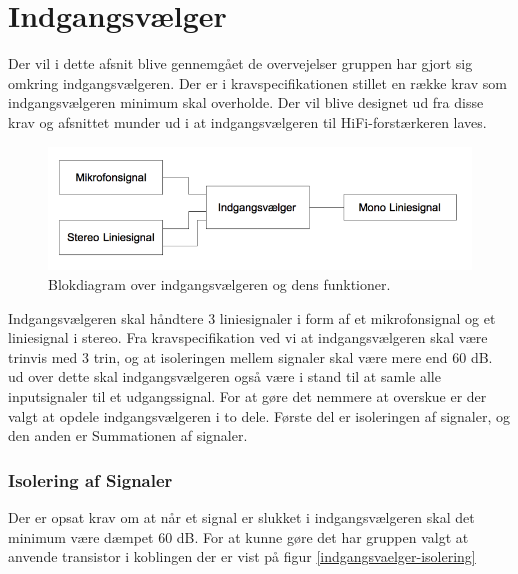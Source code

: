 \chapter{Indgangsvælger}
\label{indgangsvaelger}
Der vil i dette afsnit blive gennemgået de overvejelser gruppen har gjort sig omkring indgangsvælgeren. Der er i kravspecifikationen stillet en række krav som indgangsvælgeren minimum skal overholde. Der vil blive designet ud fra disse krav og afsnittet munder ud i at indgangsvælgeren til HiFi-forstærkeren laves.

\begin{figure}[h]
\centering
\includegraphics[scale=0.4]{implementering/indgangsvaelger/overordnetdesign.png}
\caption{Blokdiagram over indgangsvælgeren og dens funktioner.}
\label{indgangsvaelger-overordnet}
\end{figure}

Indgangsvælgeren skal håndtere 3 liniesignaler i form af et mikrofonsignal og et liniesignal i stereo. Fra kravspecifikation ved vi at indgangsvælgeren skal være trinvis med 3 trin, og at isoleringen mellem signaler skal være mere end 60 dB. ud over dette skal indgangsvælgeren også være i stand til at samle alle inputsignaler til et udgangssignal. For at gøre det nemmere at overskue er der valgt at opdele indgangsvælgeren i to dele. Første del er isoleringen af signaler, og den anden er Summationen af signaler.

\subsection*{Isolering af Signaler}
Der er opsat krav om at når et signal er slukket i indgangsvælgeren skal det minimum være dæmpet 60 dB. For at kunne gøre det har gruppen valgt at anvende transistor i koblingen der er vist på figur \ref{indgangsvaelger-isolering}

